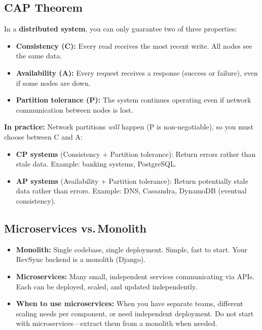 \documentclass[12pt, a4paper, oneside]{book}
\begin{document}
\subsection{CAP Theorem}

In a \textbf{distributed system}, you can only guarantee two of three properties:

\begin{itemize}[leftmargin=2em]
    \item \textbf{Consistency (C):} Every read receives the most recent write. All nodes see the same data.
    \item \textbf{Availability (A):} Every request receives a response (success or failure), even if some nodes are down.
    \item \textbf{Partition tolerance (P):} The system continues operating even if network communication between nodes is lost.
\end{itemize}

\textbf{In practice:} Network partitions \emph{will} happen (P is non-negotiable), so you must choose between C and A:
\begin{itemize}[leftmargin=2em]
    \item \textbf{CP systems} (Consistency + Partition tolerance): Return errors rather than stale data. Example: banking systems, PostgreSQL.
    \item \textbf{AP systems} (Availability + Partition tolerance): Return potentially stale data rather than errors. Example: DNS, Cassandra, DynamoDB (eventual consistency).
\end{itemize}

\subsection{Microservices vs.\,Monolith}

\begin{itemize}[leftmargin=2em]
    \item \textbf{Monolith:} Single codebase, single deployment. Simple, fast to start. Your RevSync backend is a monolith (Django).
    \item \textbf{Microservices:} Many small, independent services communicating via APIs. Each can be deployed, scaled, and updated independently.
    \item \textbf{When to use microservices:} When you have separate teams, different scaling needs per component, or need independent deployment. Do not start with microservices---extract them from a monolith when needed.
\end{itemize}
\end{document}
